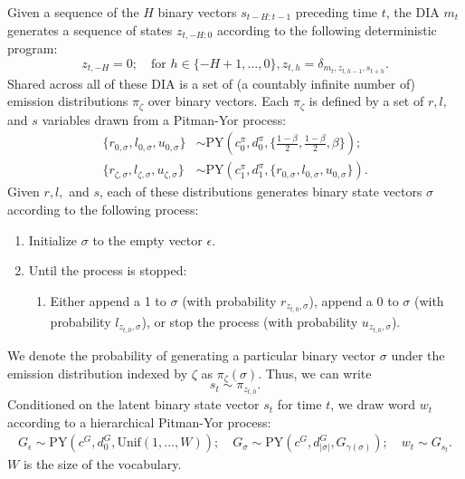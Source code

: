 \documentclass{article}
\newcommand{\PY}{\textrm{PY}}
\newcommand{\unif}{\textrm{Unif}}
\begin{document}
Given a sequence of the $H$ binary vectors $s_{t-H:t-1}$ preceding
time $t$, the DIA $m_t$ generates a sequence of states $z_{t,-H:0}$
according to the following deterministic program:
\begin{equation}
z_{t,-H} = 0; \quad
\textrm{for } h \in \{-H+1,\ldots,0\}, z_{t,h} = \delta_{m_t, z_{t,h-1}, s_{t+h}}.
\end{equation}
Shared across all of these DIA is a set of (a countably infinite
number of) emission distributions $\pi_{\zeta}$ over binary
vectors. Each $\pi_{\zeta}$ is defined by a set of $r, l,$ and $s$
variables drawn from a Pitman-Yor process:
\begin{equation}
\begin{split}
\{r_{0,\sigma}, l_{0,\sigma}, u_{0,\sigma}\} &\sim \PY(c_0^\pi, d^\pi_{0}, 
\{\frac{1-\beta}{2}, \frac{1-\beta}{2}, \beta\}); \\
\{r_{\zeta,\sigma}, l_{\zeta,\sigma}, u_{\zeta,\sigma}\} &\sim 
\PY(c_1^\pi, d^\pi_{1}, \{r_{0,\sigma}, l_{0,\sigma}, u_{0,\sigma}\}).
\end{split}
\end{equation}
Given $r, l,$ and $s$, each of these distributions generates binary
state vectors $\sigma$ according to the following process:
\begin{enumerate}
\item Initialize $\sigma$ to the empty vector $\epsilon$.
\item Until the process is stopped:
  \begin{enumerate}
  \item Either append a 1 to $\sigma$ (with probability $r_{z_{t,0}, \sigma}$),
    append a 0 to $\sigma$ (with probability $l_{z_{t,0}, \sigma}$), or
    stop the process (with probability $u_{z_{t,0},\sigma}$).
  \end{enumerate}
\end{enumerate}
We denote the probability of generating a particular binary vector
$\sigma$ under the emission distribution indexed by $\zeta$ as
$\pi_{\zeta}(\sigma)$. Thus, we can write
\begin{equation}
s_t \sim \pi_{z_{t,0}}.
\end{equation}
Conditioned on the latent binary state vector $s_t$ for time $t$, we
draw word $w_t$ according to a hierarchical Pitman-Yor process:
\begin{equation}
\begin{split}
G_{\epsilon} \sim \PY(c^G, d^G_{0},\unif(1,\ldots,W)); \quad
G_\sigma \sim \PY(c^G, d^G_{|\sigma|},G_{\gamma(\sigma)}); \quad
w_t \sim G_{s_t}.
\end{split}
\end{equation}
$W$ is the size of the vocabulary.
\end{document}
